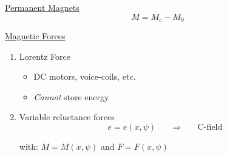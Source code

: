 \documentclass[ 12pt, twocolumn]{article}    %
\begin{document}
\noindent
\underline{Permanent Magnets}
\begin{equation*}
    M = M_c-M_0
\end{equation*}
\begin{center}
        \begin{footnotesize}
    \end{footnotesize}
\end{center}
\noindent
\underline{Magnetic Forces}
\begin{enumerate}
    \item Lorentz Force
        \begin{itemize}
            \item  DC motors, voice-coils, etc.
            \item \emph{Cannot} store energy
        \end{itemize}
        \begin{center}
            \begin{footnotesize}
                \end{footnotesize}
        \end{center}
   \item Variable reluctance forces
        \begin{equation*}
            e = e(x,\psi) \hspace{20pt} \Longrightarrow \hspace{20pt} \text{C-field}
        \end{equation*}
        \begin{center}
            \begin{footnotesize}
            \end{footnotesize}
        \end{center}
        \noindent
        with: \(M=M(x,\psi)\) and \(F=F(x,\psi)\)
\end{enumerate}
\end{document}
